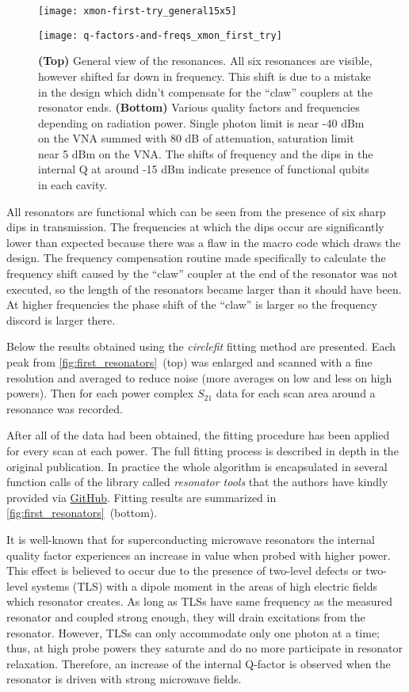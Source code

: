 \documentclass[12pt, twoside]{report}
\numberwithin{equation}{section}
\begin{document}
\begin{figure}
\centering
\texttt{[image: xmon-first-try\_general15x5]}

\texttt{[image: q-factors-and-freqs\_xmon\_first\_try]}

\caption{\textbf{(Top)} General view of the resonances. All six resonances are visible, however shifted far down in frequency. This shift is due to a mistake in the design which didn't compensate for the ``claw'' couplers at the resonator ends. \textbf{(Bottom)} Various quality factors and frequencies depending on radiation power. Single photon limit is near -40 dBm on the VNA summed with 80 dB of attenuation, saturation limit near 5 dBm on the VNA. The shifts of frequency and the dips in the internal Q at around -15 dBm indicate presence of functional qubits in each cavity.}
\label{fig:first_resonators}
\end{figure}

All resonators are functional which can be seen from the presence of six sharp dips in transmission. The frequencies at which the dips occur are significantly lower than expected because there was a flaw in the macro code which draws the design. The frequency compensation routine made specifically to calculate the frequency shift\cite{Sank2014} caused by the ``claw'' coupler at the end of the resonator was not executed, so the length of the resonators became larger than it should have been. At higher frequencies the phase shift of the ``claw'' is larger so the frequency discord is larger there.

Below the results obtained using the \textit{circlefit}\cite{probst2015} fitting method are presented. Each peak from \autoref{fig:first_resonators}~(top) was enlarged and scanned with a fine resolution and averaged to reduce noise (more averages on low and less on high powers). Then for each power complex $S_{21}$ data for each scan area around a resonance was recorded.

After all of the data had been obtained, the fitting procedure has been applied for every scan at each power. The full fitting process is described in depth in the original publication\cite{probst2015}. In practice the whole algorithm is encapsulated in several function calls of the library called \textit{resonator tools} that the authors have kindly provided via \href{https://github.com/sebastianprobst/resonatortools}{GitHub}. Fitting results are summarized in \autoref{fig:first_resonators}~(bottom).

It is well-known\cite{wang2009} that for superconducting microwave resonators the internal quality factor experiences an increase in value when probed with higher power. This effect is believed to occur due to the presence of two-level defects or two-level systems (TLS) with a dipole moment in the areas of high electric fields which resonator creates. As long as TLSs have same frequency as the measured resonator and coupled strong enough, they will drain excitations from the resonator. However, TLSs can only accommodate only one photon at a time; thus, at high probe powers they saturate and do no more participate in resonator relaxation. Therefore, an increase of the internal Q-factor is observed when the resonator is driven with strong microwave fields.
\end{document}
